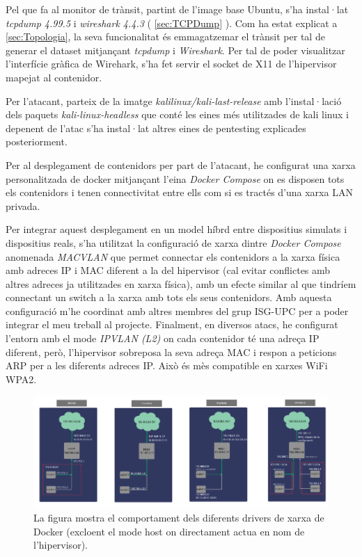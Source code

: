 Pel que fa al monitor de trànsit, partint de l’image base Ubuntu, s’ha instal·lat \textit{tcpdump 4.99.5} i \textit{wireshark 4.4.3} ( \ref{sec:TCPDump} ). Com ha estat explicat a \ref{sec:Topologia}, la seva funcionalitat és emmagatzemar el trànsit per tal de generar el dataset mitjançant \textit{tcpdump} i \textit{Wireshark}. Per tal de poder visualitzar l'interfície gràfica de Wirehark, s’ha fet servir el socket de X11 de l’hipervisor mapejat al contenidor.

Per l’atacant, parteix de la imatge \textit{kalilinux/kali-last-release} \cite{kaliimg} amb l’instal·lació dels paquets \textit{kali-linux-headless} que conté les eines més utilitzades de kali linux i depenent de l’atac s’ha instal·lat altres eines de pentesting explicades posteriorment.

Per al desplegament de contenidors per part de l'atacant, he configurat una xarxa personalitzada de docker mitjançant l'eina \textit{Docker Compose} on es disposen tots els contenidors i tenen connectivitat entre ells com si es tractés d'una xarxa LAN privada. 

Per integrar aquest desplegament en un model híbrd entre dispositius simulats i dispositius reals, s’ha utilitzat la configuració de xarxa dintre \textit{Docker Compose} anomenada \textit{MACVLAN} que permet connectar els contenidors a la xarxa física amb adreces IP i MAC diferent a la del hipervisor (cal evitar conflictes amb altres adreces ja utilitzades en xarxa física), amb un efecte similar al que tindríem connectant un switch a la xarxa amb tots els seus contenidors. Amb aquesta configuració m'he coordinat amb altres membres del grup ISG-UPC per a poder integrar el meu treball al projecte. 
Finalment, en diversos atacs, he configurat l'entorn amb el mode \textit{IPVLAN (L2)} on cada contenidor té una adreça IP diferent, però, l'hipervisor sobreposa la seva adreça MAC i respon a peticions ARP per a les diferents adreces IP. Això és mès compatible en xarxes WiFi WPA2.

 \begin{figure}[H]
    \centering
    \includegraphics[width=1\textwidth]{img/DockerNetworks.png}
    \caption{La figura mostra el comportament dels diferents drivers de xarxa de Docker (excloent el mode host on directament actua en nom de l'hipervisor).}
    \label{fig:DockerNetworks}
  \end{figure}

